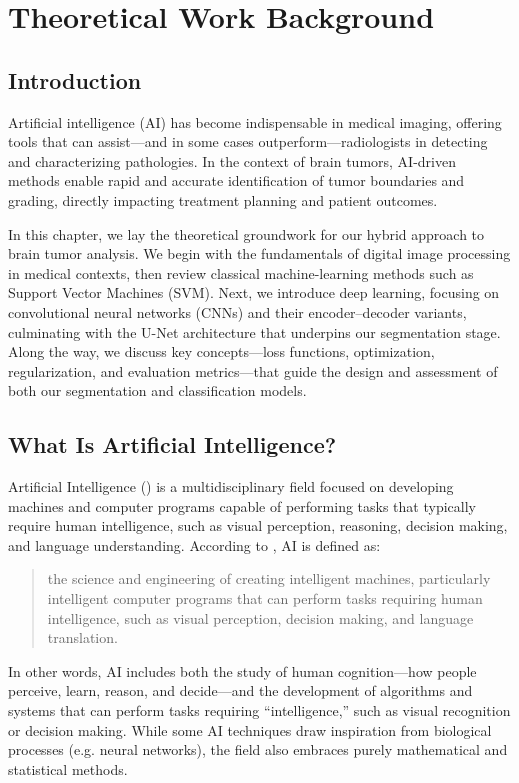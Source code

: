 \chapter{Theoretical Work Background}

\section{Introduction}
\label{sec:intro}
Artificial intelligence (AI) has become indispensable in medical imaging, offering tools that can assist—and in some cases outperform—radiologists in detecting and characterizing pathologies. In the context of brain tumors, AI-driven methods enable rapid and accurate identification of tumor boundaries and grading, directly impacting treatment planning and patient outcomes.

In this chapter, we lay the theoretical groundwork for our hybrid approach to brain tumor analysis. We begin with the fundamentals of digital image processing in medical contexts, then review classical machine-learning methods such as Support Vector Machines (SVM). Next, we introduce deep learning, focusing on convolutional neural networks (CNNs) and their encoder–decoder variants, culminating with the U-Net architecture that underpins our segmentation stage. Along the way, we discuss key concepts—loss functions, optimization, regularization, and evaluation metrics—that guide the design and assessment of both our segmentation and classification models.


\section{What Is Artificial Intelligence?}

Artificial Intelligence () is a multidisciplinary field focused on developing machines and computer programs capable of performing tasks that typically require human intelligence, such as visual perception, reasoning, decision making, and language understanding. According to \cite{sciencedirect_ai_overview}, AI is defined as:

\begin{quotation}
  the science and engineering of creating intelligent machines, particularly intelligent computer programs that can perform tasks requiring human intelligence, such as visual perception, decision making, and language translation.
\end{quotation}

In other words, AI includes both the study of human cognition—how people perceive, learn, reason, and decide—and the development of algorithms and systems that can perform tasks requiring “intelligence,” such as visual recognition or decision making. While some AI techniques draw inspiration from biological processes (e.g. neural networks), the field also embraces purely mathematical and statistical methods.

